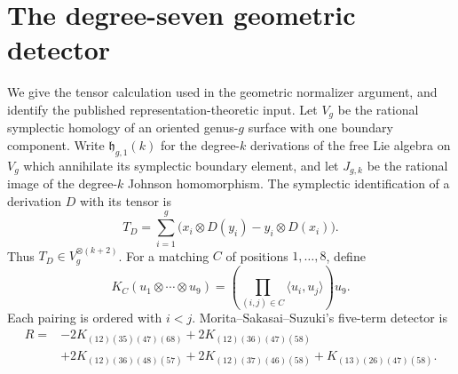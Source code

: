 \section{The degree-seven geometric detector}
\label{sec:geometric-detector}

We give the tensor calculation used in the geometric normalizer
argument, and identify the published representation-theoretic input.
Let $V_g$ be the rational symplectic homology of an oriented genus-$g$
surface with one boundary component. Write $\mathfrak h_{g,1}(k)$
for the degree-$k$ derivations of the free Lie algebra on $V_g$
which annihilate its symplectic boundary element, and let
$J_{g,k}$ be the rational image of the degree-$k$ Johnson homomorphism.
The symplectic identification of a derivation $D$ with its tensor is
\[
 T_D=\sum_{i=1}^g\bigl(x_i\otimes D(y_i)-y_i\otimes D(x_i)\bigr).
\]
Thus $T_D\in V_g^{\otimes(k+2)}$.
For a matching $C$ of positions $1,\ldots,8$, define
\[
 K_C(u_1\otimes\cdots\otimes u_9)
  =\left(\prod_{(i,j)\in C}\langle u_i,u_j\rangle\right)u_9.
\]
Each pairing is ordered with $i<j$.
Morita--Sakasai--Suzuki's five-term detector
\cite[Proposition~4.1, p.~11]{MSS2026} is
\begin{align*}
 R={}&-2K_{(12)(35)(47)(68)}
       +2K_{(12)(36)(47)(58)}\\
    &+2K_{(12)(36)(48)(57)}
       +2K_{(12)(37)(46)(58)}
       +K_{(13)(26)(47)(58)}.
\end{align*}

